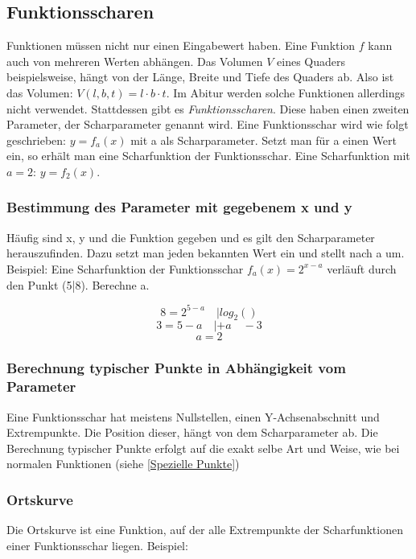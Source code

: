 \documentclass{article}
\begin{document}
\subsection{Funktionsscharen}

Funktionen müssen nicht nur einen Eingabewert haben. Eine Funktion $f$ kann auch von mehreren Werten abhängen.
Das Volumen $V$ eines Quaders beispielsweise, hängt von der Länge, Breite und Tiefe des Quaders ab.
Also ist das Volumen: $V(l,b,t)=l \cdot b \cdot t$. Im Abitur werden solche Funktionen allerdings nicht verwendet.
Stattdessen gibt es \emph{Funktionsscharen}. Diese haben einen zweiten Parameter, der Scharparameter genannt wird.
Eine Funktionsschar wird wie folgt geschrieben: $y=f_a(x)$ mit a als Scharparameter. Setzt man für a einen Wert ein,
so erhält man eine Scharfunktion der Funktionsschar. Eine Scharfunktion mit $a=2$: $y=f_2(x)$.

\subsubsection{Bestimmung des Parameter mit gegebenem x und y}
Häufig sind x, y und die Funktion gegeben und es gilt den Scharparameter herauszufinden. Dazu setzt man jeden bekannten
Wert ein und stellt nach a um. Beispiel: Eine Scharfunktion der Funktionsschar $f_a(x)=2^{x-a}$
verläuft durch den Punkt (5|8). Berechne a.

\[ 8=2^{5-a} \quad | log_2() \]
\[ 3=5-a \quad | +a \quad -3 \]
\[ a=2 \]

\subsubsection{Berechnung typischer Punkte in Abhängigkeit vom Parameter}
Eine Funktionsschar hat meistens Nullstellen, einen Y-Achsenabschnitt und Extrempunkte. Die Position dieser,
hängt von dem Scharparameter ab. Die Berechnung typischer Punkte erfolgt auf die exakt selbe Art und Weise,
wie bei normalen Funktionen (siehe \ref{Spezielle Punkte})

\subsubsection{Ortskurve}

Die Ortskurve ist eine Funktion, auf der alle Extrempunkte der Scharfunktionen einer Funktionsschar liegen. Beispiel:
\end{document}
